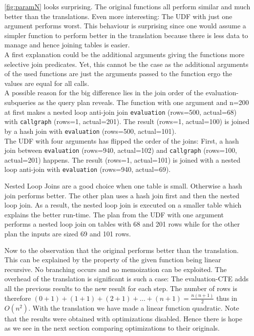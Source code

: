 \autoref{fig:paramN} looks surprising. The original functions all perform similar and much better than the translations. Even more interesting: The UDF with just one argument performs worst. This behaviour is surprising since one would assume a simpler function to perform better in the translation because there is less data to manage and hence joining tables is easier.\\
A first explanation could be the additional arguments giving the functions more selective join predicates. Yet, this cannot be the case as the additional arguments of the used functions are just the arguments passed to the function ergo the values are equal for all calls.\\
A possible reason for the big difference lies in the join order of the evaluation-subqueries as the query plan reveals. The function with one argument and n=200 at first makes a nested loop anti-join join \texttt{evaluation} (rows=500, actual=68) with \texttt{callgraph} (rows=1, actual=201). The result (rows=1, actual=100) is joined by a hash join with \texttt{evaluation} (rows=500, actual=101).\\
The UDF with four arguments has flipped the order of the joins: First, a hash join between \texttt{evaluation} (rows=940, actual=102) and \texttt{callgraph} (rows=100, actual=201) happens. The result (rows=1, actual=101) is joined with a nested loop anti-join with \texttt{evaluation} (rows=940, actual=69).

Nested Loop Joins are a good choice when one table is small. Otherwise a hash join performs better. The other plan uses a hash join first and then the nested loop join. As a result, the nested loop join is executed on a smaller table which explains the better run-time. The plan from the UDF with one argument performs a nested loop join on tables with 68 and 201 rows while for the other plan the inputs are sized 69 and 101 rows.

Now to the observation that the original performs better than the translation. This can be explained by the property of the given function being linear recursive. No branching occurs and no memoization can be exploited. The overhead of the translation is significant is such a case: The evaluation-CTE adds all the previous results to the new result for each step. The number of rows is therefore $(0 + 1) + (1 + 1) + (2 + 1) + \dots + (n + 1) = \frac{n(n+1)}{2}$ thus in $O(n^2)$. With the translation we have made a linear function quadratic. Note that the results were obtained with optimizations disabled. Hence there is hope as we see in the next section comparing optimizations to their originals.


